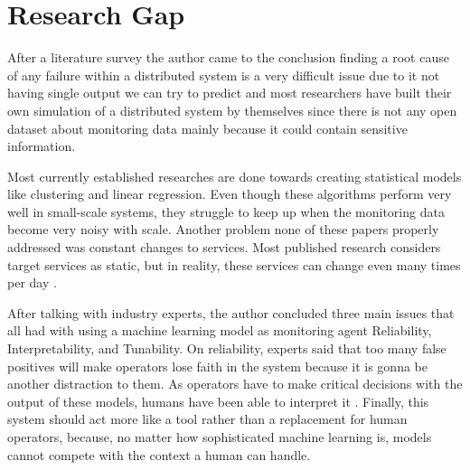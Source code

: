 \section{Research Gap}

After a literature survey the author came to the conclusion finding a root cause of any failure within a distributed system is a very difficult issue due to it not having single output we can try to predict and most researchers have built their own simulation of a distributed system by themselves since there is not any open dataset about monitoring data mainly because it could contain sensitive information. 

Most currently established researches are done towards creating statistical models like clustering and linear regression. Even though these algorithms perform very well in small-scale systems, they struggle to keep up when the monitoring data become very noisy with scale. Another problem none of these papers properly  addressed was constant changes to services. Most published research considers target services as static, but in reality, these services can change even many times per day \citep{GoingtoM51:online}.

After talking with industry experts, the author concluded three main issues that all had with using a machine learning model as monitoring agent Reliability, Interpretability, and Tunability. On reliability, experts said that too many false positives will make operators lose faith in the system because it is gonna be another distraction to them. As operators have to make critical decisions with the output of these models, humans have been able to interpret it \citep{ribeiro2016should}. Finally, this system should act more like a tool rather than a replacement for human operators, because, no matter how sophisticated machine learning is, models cannot compete with the context a human can handle. 
